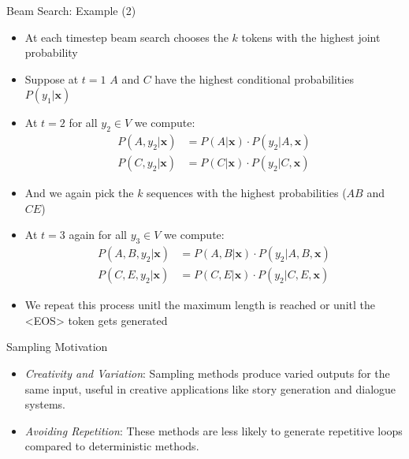 \begin{frame}{Beam Search: Example (2)}
\footnotesize%


\vfill

\begin{itemize}
    \item At each timestep beam search chooses the $k$ tokens with the highest joint probability
    \item Suppose at $t=1$ $A$ and $C$ have the highest conditional probabilities $P(y_1|\mathbf{x})$
    \item At $t=2$ for all $y_2\in V$ we compute:
    $$
    \begin{aligned}
    P(A,y_2|\mathbf{x}) &= P(A|\mathbf{x})\cdot P(y_2|A,\mathbf{x}) \\
    P(C,y_2|\mathbf{x}) &= P(C|\mathbf{x})\cdot P(y_2|C,\mathbf{x})
    \end{aligned}
    $$
    \item And we again pick the $k$ sequences with the highest probabilities ($AB$ and $CE$)
    \item At $t=3$ again for all $y_3\in V$ we compute:
    $$
    \begin{aligned}
    P(A,B,y_2|\mathbf{x}) &= P(A,B|\mathbf{x})\cdot P(y_2|A,B,\mathbf{x}) \\
    P(C,E,y_2|\mathbf{x}) &= P(C,E|\mathbf{x})\cdot P(y_2|C,E,\mathbf{x})
    \end{aligned}
    $$
    \item We repeat this process unitl the maximum length is reached or unitl the <EOS> token gets generated
\end{itemize}

\vfill
    
\end{frame}



\begin{vbframe}{Sampling Motivation}

\vfill
    
\begin{itemize}
    \item \textit{Creativity and Variation}: Sampling methods produce varied outputs for the same input, useful in creative applications like story generation and dialogue systems.
    \item \textit{Avoiding Repetition}: These methods are less likely to generate repetitive loops compared to deterministic methods.
\end{itemize}

\vfill

\end{vbframe}

